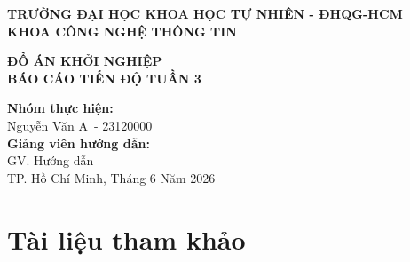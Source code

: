 \documentclass[12pt,a4paper]{article}
\newcommand{\weeknumber}{3}
\newcommand{\reporttitle}{BÁO CÁO TIẾN ĐỘ TUẦN \weeknumber}
\newcommand{\subject}{ĐỒ ÁN KHỞI NGHIỆP}
\newcommand{\studentname}{Nguyễn Văn A}
\newcommand{\studentid}{23120000}
\newcommand{\instructor}{GV. Hướng dẫn}
\begin{document}
\begin{titlepage}
    \begin{center}
        \large
        \textbf{TRƯỜNG ĐẠI HỌC KHOA HỌC TỰ NHIÊN - ĐHQG-HCM} \\
        \textbf{KHOA CÔNG NGHỆ THÔNG TIN} \\
        \vspace{1cm}
        \vspace{1.5cm}
        
        \Large
        \textcolor{primary}{\textbf{\subject}} \\
        \vspace{1cm}
        \huge
        \textcolor{primary}{\textbf{\reporttitle}} \\
        \vspace{1.5cm}
        
        \large
        \textbf{Nhóm thực hiện:} \\
        \studentname\ - \studentid \\
        \vspace{1cm}
        \textbf{Giảng viên hướng dẫn:} \\
        \instructor \\
        
        \vfill
        \large
        TP. Hồ Chí Minh, Tháng 6 Năm 2026
    \end{center}
\end{titlepage}

\newpage
\tableofcontents
\newpage




\section{Tài liệu tham khảo}


\end{document}
